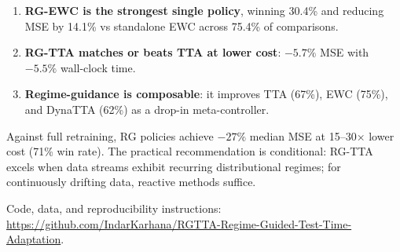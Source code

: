 \documentclass[journal]{IEEEtran}
\newcommand{\repourl}{\url{https://github.com/IndarKarhana/RGTTA-Regime-Guided-Test-Time-Adaptation}}
\begin{document}
\begin{enumerate}[nosep]
  \item \textbf{RG-EWC is the strongest single policy}, winning 30.4\% and reducing MSE by 14.1\% vs standalone EWC across 75.4\% of comparisons.
  \item \textbf{RG-TTA matches or beats TTA at lower cost}: $-5.7\%$ MSE with $-5.5\%$ wall-clock time.
  \item \textbf{Regime-guidance is composable}: it improves TTA (67\%), EWC (75\%), and DynaTTA (62\%) as a drop-in meta-controller.
\end{enumerate}

Against full retraining, RG policies achieve $-27\%$ median MSE at 15--30$\times$ lower cost (71\% win rate). The practical recommendation is conditional: RG-TTA excels when data streams exhibit recurring distributional regimes; for continuously drifting data, reactive methods suffice.

Code, data, and reproducibility instructions: \repourl.



\end{document}
